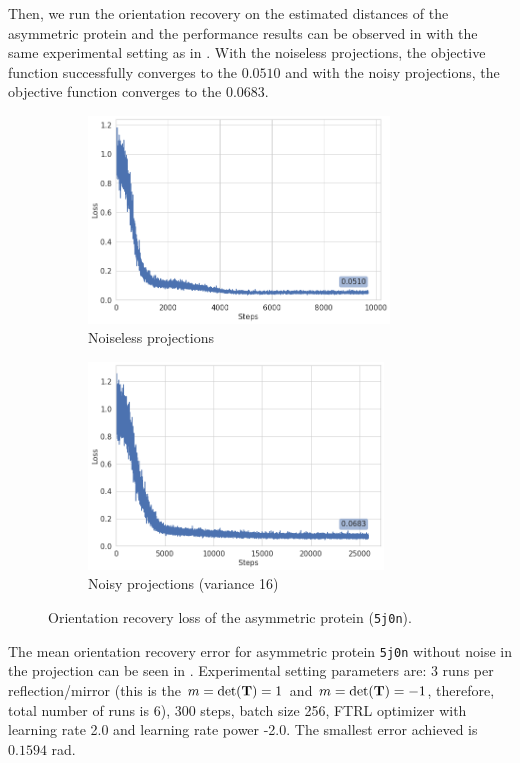 Then, we run the orientation recovery on the estimated distances of the asymmetric protein and the performance results can be observed in  with the same experimental setting as in .
With the noiseless projections, the objective function successfully converges to the $0.0510$ and with the noisy projections, the objective function converges to the $0.0683$.


\begin{figure}[ht!]
    \centering
    \begin{subfigure}[b]{0.45\textwidth}
        \includegraphics[height=5.5cm]{images/5j0n_noise0_angle_recovery.png}
        \caption{Noiseless projections}
    \end{subfigure}
    \hfill
    \begin{subfigure}[b]{0.5\textwidth}
    \centering
        \includegraphics[height=5.5cm]{images/5j0n_noise16_angle_recovery.png}
        \caption{Noisy projections (variance 16)}
    \end{subfigure}
    \caption{ Orientation recovery loss of the asymmetric protein (\texttt{5j0n}).}
    \label{fig:5j0n-orientation-recovery-loss-est}
\end{figure}

The mean orientation recovery error for asymmetric protein \texttt{5j0n} without noise in the projection can be seen in .
Experimental setting parameters are: 3 runs per reflection/mirror (this is the $m=\det(\mathbf{T})=1$ and $m=\det(\mathbf{T})=-1$, therefore, total number of runs is 6), 300 steps, batch size 256, FTRL optimizer with learning rate 2.0 and learning rate power -2.0.
The smallest error achieved is $0.1594$ rad.

